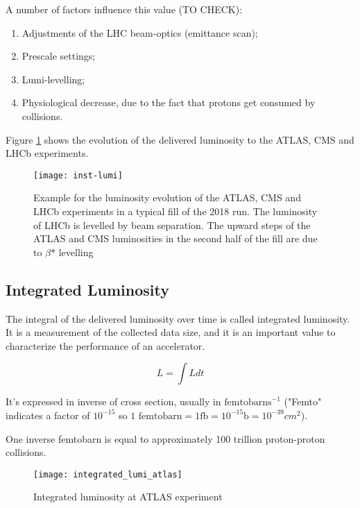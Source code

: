 A number of factors influence this value (TO CHECK):

\begin{enumerate}
	\item Adjustments of the LHC beam-optics (emittance scan);
	\item Prescale settings;
	\item Lumi-levelling;
	\item Physiological decrease, due to the fact that protons get consumed by collisions.
\end{enumerate}

Figure \ref{fig:lum_evolution} shows the evolution of the delivered luminosity to the ATLAS, CMS and LHCb experiments.


\begin{figure}
	\centerline{
		\texttt{[image: inst-lumi]}}
	\caption{Example for the luminosity evolution of the ATLAS, CMS and LHCb experiments in a typical fill of the 2018 run. The luminosity of LHCb is levelled by beam separation. The upward steps of the ATLAS and CMS luminosities in the second half of the fill are due to $\beta\text{*}$ levelling
		\cite{Wenninger:2018cgs}}
	\label{fig:lum_evolution}
\end{figure}


\label{int_lum_def}
\subsection{Integrated Luminosity}

The integral of the delivered luminosity over time is called integrated luminosity. It is a measurement of the collected data size, and it is an important value to characterize the performance of an accelerator.

\begin{equation}
	L = \int Ldt
\end{equation}

It's expressed in inverse of cross section, usually in $\text{femtobarns}^{-1}$ ("Femto" indicates a factor of $10^{-15}$ so $\text{1 femtobarn} = 1 \text{fb} = 10^{-15} \text{b} = 10^{-39} cm^2 $).

One inverse femtobarn is equal to approximately 100 trillion proton-proton collisions.

\begin{figure}
	\centerline{
		\texttt{[image: integrated\_lumi\_atlas]}}
	\caption{Integrated luminosity at ATLAS experiment \cite{Bruce:2016iew}}
\end{figure}

